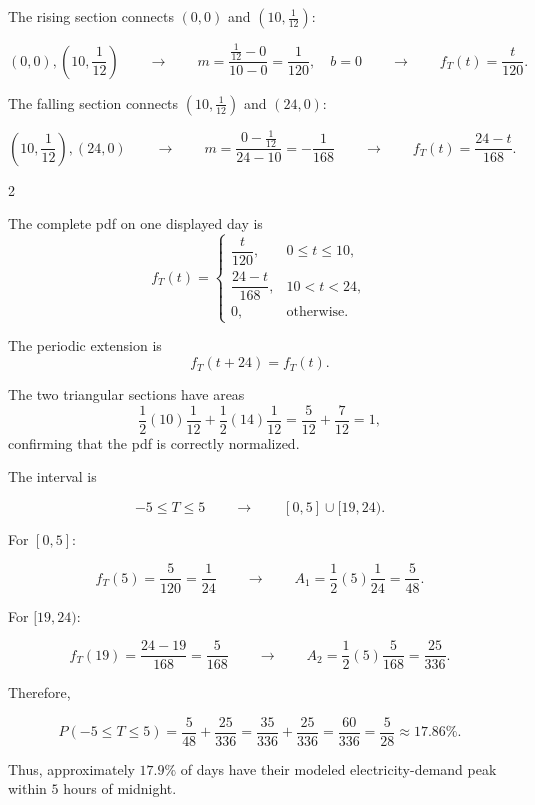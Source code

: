 	The rising section connects $(0,0)$ and $\left(10,\frac1{12}\right)$:
	
	$$
	(0,0),\left(10,\frac1{12}\right)
	\qquad\longrightarrow\qquad
	m=\frac{\frac1{12}-0}{10-0}=\frac1{120},\quad b=0
	\qquad\longrightarrow\qquad
	f_T(t)=\frac{t}{120}.
	$$
	
	The falling section connects $\left(10,\frac1{12}\right)$ and $(24,0)$:
	
	$$
	\left(10,\frac1{12}\right),(24,0)
	\qquad\longrightarrow\qquad
	m=\frac{0-\frac1{12}}{24-10}=-\frac1{168}
	\qquad\longrightarrow\qquad
	f_T(t)=\frac{24-t}{168}.
	$$
	
	\setlength{\columnseprule}{0.4pt}
	\begin{multicols}{2}
		
		The complete pdf on one displayed day is
		\[
		f_T(t)=
		\begin{cases}
			\dfrac{t}{120},&0\le t\le10,\\[2mm]
			\dfrac{24-t}{168},&10<t<24,\\[2mm]
			0,&\text{otherwise}.
		\end{cases}
		\]
		
		\columnbreak
		
		The periodic extension is
		\[
		f_T(t+24)=f_T(t).
		\]
		
		
		
		The two triangular sections have areas
		\[
		\frac12(10)\frac1{12}
		+
		\frac12(14)\frac1{12}
		=
		\frac5{12}+\frac7{12}
		=1,
		\]
		confirming that the pdf is correctly normalized.
		
	\end{multicols}
	\setlength{\columnseprule}{0pt}
	
	The interval is
	
	$$
	-5\le T\le5
	\qquad\longrightarrow\qquad
	[0,5]\cup[19,24).
	$$
	
	For $[0,5]$:
	
	$$
	f_T(5)=\frac5{120}=\frac1{24}
	\qquad\longrightarrow\qquad
	A_1=\frac12(5)\frac1{24}=\frac5{48}.
	$$
	
	For $[19,24)$:
	
	$$
	f_T(19)=\frac{24-19}{168}=\frac5{168}
	\qquad\longrightarrow\qquad
	A_2=\frac12(5)\frac5{168}=\frac{25}{336}.
	$$
	
	Therefore,
	
	$$
	P(-5\le T\le5)
	=\frac5{48}+\frac{25}{336}
	=\frac{35}{336}+\frac{25}{336}
	=\frac{60}{336}
	=\frac5{28}
	\approx17.86\%.
	$$
	
	Thus, approximately $17.9\%$ of days have their modeled electricity-demand peak within $5$ hours of midnight.

	
	
